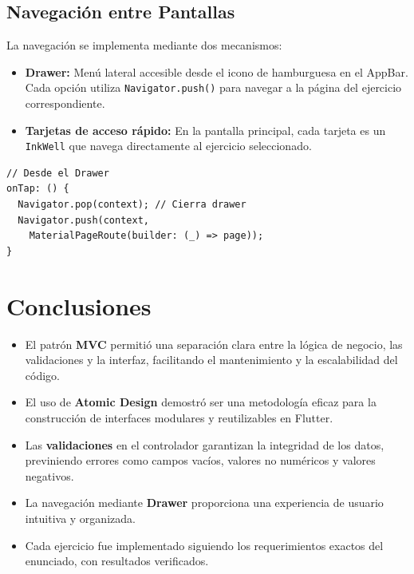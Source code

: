 \documentclass{article}
\begin{document}
\subsection{Navegación entre Pantallas}

La navegación se implementa mediante dos mecanismos:
\begin{itemize}
    \item \textbf{Drawer:} Menú lateral accesible desde el icono de hamburguesa en el AppBar. Cada opción utiliza \texttt{Navigator.push()} para navegar a la página del ejercicio correspondiente.
    \item \textbf{Tarjetas de acceso rápido:} En la pantalla principal, cada tarjeta es un \texttt{InkWell} que navega directamente al ejercicio seleccionado.
\end{itemize}

\begin{tcolorbox}[title=Código de Navegación]
\begin{lstlisting}
// Desde el Drawer
onTap: () {
  Navigator.pop(context); // Cierra drawer
  Navigator.push(context,
    MaterialPageRoute(builder: (_) => page));
}
\end{lstlisting}
\end{tcolorbox}

\newpage

\section{Conclusiones}
\begin{itemize}[label=\small\color{verdeO}$\blacksquare$]
    \item El patrón \textbf{MVC} permitió una separación clara entre la lógica de negocio, las validaciones y la interfaz, facilitando el mantenimiento y la escalabilidad del código.
    \item El uso de \textbf{Atomic Design} demostró ser una metodología eficaz para la construcción de interfaces modulares y reutilizables en Flutter.
    \item Las \textbf{validaciones} en el controlador garantizan la integridad de los datos, previniendo errores como campos vacíos, valores no numéricos y valores negativos.
    \item La navegación mediante \textbf{Drawer} proporciona una experiencia de usuario intuitiva y organizada.
    \item Cada ejercicio fue implementado siguiendo los requerimientos exactos del enunciado, con resultados verificados.
\end{itemize}
\end{document}

